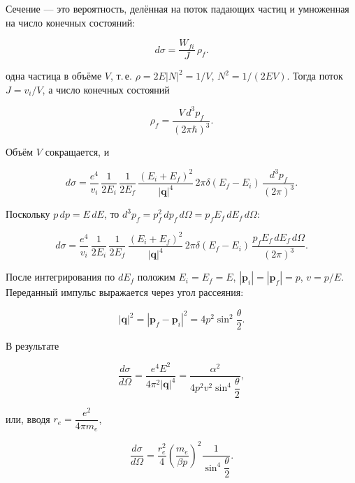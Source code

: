 \documentclass[../final.tex]{subfiles}
\begin{document}
Сечение --- это вероятность, делённая на поток падающих частиц
и умноженная на число конечных состояний:

\begin{equation*}
    d\sigma
    =
    \frac{W_{fi}}{J}\,\rho_f.
\end{equation*}

 одна частица в объёме $V$, т.\,е.
$\rho=2E|N|^2=1/V$, $N^2=1/(2EV)$. Тогда поток $J=v_i/V$,
а число конечных состояний

\begin{equation*}
    \rho_f
    =
    \frac{V\,d^3p_f}{(2\pi\hbar)^3}.
\end{equation*}

Объём $V$ сокращается, и

\begin{equation*}
    d\sigma
    =
    \frac{e^4}{v_i}\,
    \frac{1}{2E_i}\,
    \frac{1}{2E_f}\,
    \frac{\left(E_i+E_f\right)^2}{|\mathbf q|^4}\,
    2\pi\delta(E_f-E_i)\,
    \frac{d^3p_f}{(2\pi)^3}.
\end{equation*}

Поскольку $p\,dp=E\,dE$, то $d^3p_f=p_f^2\,dp_f\,d\Omega=p_fE_f\,dE_f\,d\Omega$:

\begin{equation*}
    d\sigma
    =
    \frac{e^4}{v_i}\,
    \frac{1}{2E_i}\,
    \frac{1}{2E_f}\,
    \frac{\left(E_i+E_f\right)^2}{|\mathbf q|^4}\,
    2\pi\delta(E_f-E_i)\,
    \frac{p_fE_f\,dE_f\,d\Omega}{(2\pi)^3}.
\end{equation*}

После интегрирования по $dE_f$ положим $E_i=E_f=E$,
$|\mathbf p_i|=|\mathbf p_f|=p$, $v=p/E$. Переданный импульс
выражается через угол рассеяния:

\begin{equation*}
    |\mathbf q|^2
    =
    |\mathbf p_f-\mathbf p_i|^2
    =
    4p^2\sin^2\frac{\theta}{2}.
\end{equation*}

В результате

\begin{equation*}
    \frac{d\sigma}{d\Omega}
    =
    \frac{e^4E^2}{4\pi^2|\mathbf q|^4}
    =
    \frac{\alpha^2}{4p^2v^2\sin^4\dfrac{\theta}{2}},
\end{equation*}

или, вводя $r_e=\dfrac{e^2}{4\pi m_e}$,

\begin{equation*}
    \frac{d\sigma}{d\Omega}
    =
    \frac{r_e^2}{4}
    \left(
        \frac{m_e}{\beta p}
    \right)^2
    \frac{1}{\sin^4\dfrac{\theta}{2}}.
\end{equation*}
\end{document}
